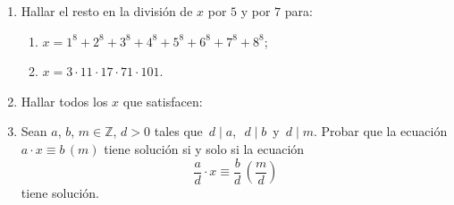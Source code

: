 \documentclass[a4paper,12pt,twoside,spanish,reqno]{amsbook}
\numberwithin{equation}{section}
\begin{document}
\begin{enumerate}
\item Hallar el resto en la división de $x$ por $5$ y por $7$ para:
    \begin{enumerate}
        \item $x=1^8 + 2^8 + 3^8 + 4^8 + 5^8 + 6^8 + 7^8 + 8^8$;
        \item $x=3\cdot 11\cdot 17\cdot 71\cdot 101$.
    \end{enumerate}


\item Hallar todos los $x$ que satisfacen:

\item Sean $a$, $b$, $m \in {\mathbb Z}$, $d>0$ tales que  \,$d\mid a$,\,  \,$d\mid b$\, y \,$d\mid m$. Probar que la ecuación $a\cdot x \equiv b\,( m)$ tiene solución si y solo si la ecuación
    \begin{equation*}
        \frac{a}{d}\cdot x \equiv \frac{b}{d}\,\left(\frac{m}{d}\right)
    \end{equation*}
    tiene solución.


\end{enumerate}
\end{document}
